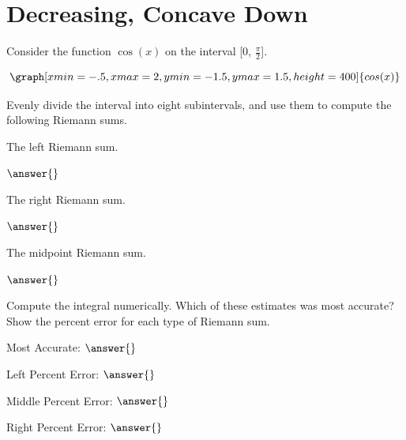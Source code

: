 \documentclass{ximera}
\begin{document}
\section{Decreasing, Concave Down}
\begin{question}
Consider the function $\cos(x)$ on the interval [0, $\frac{\pi}{2}$].

\[
\graph[xmin=-.5,xmax=2,ymin=-1.5,ymax=1.5,height=400]{cos(x)}
\]

Evenly divide the interval into eight subintervals, and use them to compute the following Riemann sums.

The left Riemann sum.

\begin{onlineOnly}
\begin{sageCell}

\end{sageCell}
\end{onlineOnly}

$\answer{}$

The right Riemann sum.

\begin{onlineOnly}
\begin{sageCell}

\end{sageCell}
\end{onlineOnly}

$\answer{}$

The midpoint Riemann sum.

\begin{onlineOnly}
\begin{sageCell}

\end{sageCell}
\end{onlineOnly}

$\answer{}$

Compute the integral numerically. Which of these estimates was most accurate? Show the percent error for each type of Riemann sum.

\begin{onlineOnly}
\begin{sageCell}

\end{sageCell}
\end{onlineOnly}

Most Accurate: $\answer{}$

Left Percent Error: $\answer{}$

Middle Percent Error: $\answer{}$

Right Percent Error: $\answer{}$
\end{question}
\end{document}
